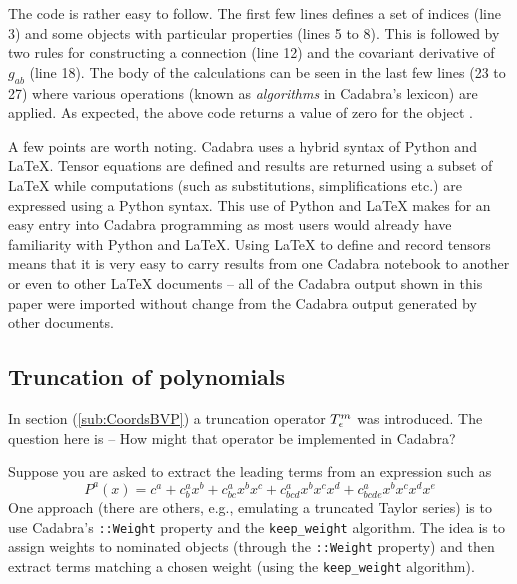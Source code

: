 \documentclass[a4paper,12pt]{article}
\numberwithin{equation}{section}
\begin{document}
The code is rather easy to follow. The first few lines defines a set of indices (line 3) and
some objects with particular properties (lines 5 to 8). This is followed by two rules for
constructing a connection (line 12) and the covariant derivative of $g_{ab}$ (line 18). The
body of the calculations can be seen in the last few lines (23 to 27) where various
operations (known as \emph{algorithms} in Cadabra's lexicon) are applied. As expected, the
above code returns a value of zero for the object .

A few points are worth noting. Cadabra uses a hybrid syntax of Python and LaTeX. Tensor
equations are defined and results are returned using a subset of LaTeX while computations
(such as substitutions, simplifications etc.) are expressed using a Python syntax. This use
of Python and LaTeX makes for an easy entry into Cadabra programming as most users would
already have familiarity with Python and LaTeX. Using LaTeX to define and record
tensors means that it is very easy to carry results from one Cadabra notebook to another or
even to other LaTeX documents -- all of the Cadabra output shown in this paper were imported
without change from the Cadabra output generated by other documents.

\subsection{Truncation of polynomials}\label{sub:Truncation}

In section (\ref{sub:CoordsBVP}) a truncation operator $T^m_{\epsilon}$ was introduced. The
question here is -- How might that operator be implemented in Cadabra?

Suppose you are asked to extract the leading terms from an expression such as
\[
P^a(x) =  c^a
        + c^a_{b} x^b
        + c^a_{bc} x^b x^c
        + c^a_{bcd} x^b x^c x^d
        + c^a_{bcde} x^b x^c x^d x^e
\]
One approach (there are others, e.g., emulating a truncated Taylor series) is to use
Cadabra's \verb!::Weight! property and the \verb!keep_weight! algorithm. The idea is to
assign weights to nominated objects (through the \verb!::Weight! property) and then extract
terms matching a chosen weight (using the \verb!keep_weight! algorithm).
\end{document}
